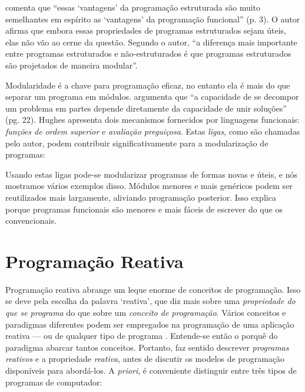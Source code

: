 \textcite{hughes1990} comenta que “essas ‘vantagens’ da programação estruturada
são muito semelhantes em espírito as ‘vantagens’ da programação funcional”
(p. 3). O autor afirma que embora essas propriedades de programas
estruturados sejam úteis, elas não vão ao cerne da questão. Segundo o autor,
“a diferença mais importante entre programas estruturados e não-estruturados
é que programas estruturados são projetados de maneira modular”.

Modularidade é a chave para programação eficaz, no entanto ela é mais do que
separar um programa em módulos. \textcite{hughes1990} argumenta que “a
capacidade de se decompor um problema em partes depende diretamente da
capacidade de unir soluções” (pg. 22). Hughes apresenta dois mecanismos
fornecidos por linguagens funcionais: \emph{funções de ordem superior} e
\emph{avaliação preguiçosa}. Estas \emph{ligas}, como são chamadas pelo autor, podem
contribuir significativamente para a modularização de programas:

\begin{citacao}
  Usando estas ligas pode-se modularizar programas de formas novas e úteis, e
  nós mostramos vários exemplos disso. Módulos menores e mais genéricos podem
  ser reutilizados mais largamente, aliviando programação posterior. Isso
  explica porque programas funcionais são menores e mais fáceis de escrever do
  que os convencionais. \cite[p.~22; tradução nossa]{hughes1990}
\end{citacao}

\section{Programação Reativa}
\label{sec:orgb1ca7aa}
Programação reativa abrange um leque enorme de conceitos de programação.
Isso se deve pela escolha da palavra ‘reativa’, que diz mais sobre uma
\emph{propriedade do que se programa} do que sobre um \emph{conceito de programação}.
Vários conceitos e paradigmas diferentes podem ser empregados na programação
de uma aplicação reativa — ou de qualquer tipo de programa \cite{roy2009}.
Entende-se então o porquê do paradigma abarcar tantos conceitos.
Portanto, faz sentido descrever \emph{programas reativos} e a propriedade
\emph{reativa}, antes de discutir os modelos de programação disponíveis para
abordá-los.
A \emph{priori}, é conveniente distinguir entre três tipos de programas de
computador:

